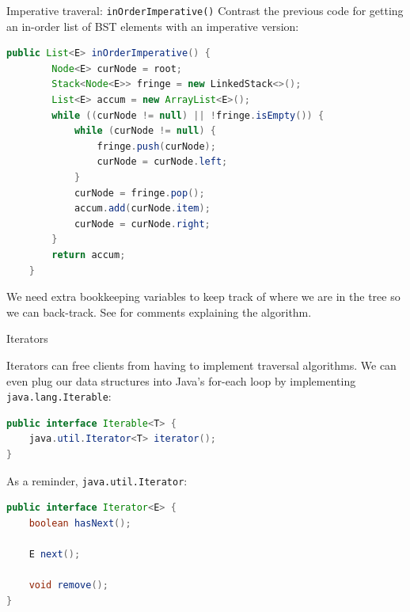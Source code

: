 \documentclass{beamer}
\begin{document}
\begin{frame}[fragile]{Imperative traveral: {\tt inOrderImperative()}}
\vspace{-.05in}
Contrast the previous code for getting an in-order list of BST elements with an imperative version:
\vspace{-.05in}
\begin{lstlisting}[language=Java]
    public List<E> inOrderImperative() {
        Node<E> curNode = root;
        Stack<Node<E>> fringe = new LinkedStack<>();
        List<E> accum = new ArrayList<E>();
        while ((curNode != null) || !fringe.isEmpty()) {
            while (curNode != null) {
                fringe.push(curNode);
                curNode = curNode.left;
            }
            curNode = fringe.pop();
            accum.add(curNode.item);
            curNode = curNode.right;
        }
        return accum;
    }
\end{lstlisting}
\vspace{-.05in}
We need extra bookkeeping variables to keep track of where we are in the tree so we can back-track.  See  for comments explaining the algorithm.

\end{frame}


\begin{frame}[fragile]{Iterators}


Iterators can free clients from having to implement traversal algorithms.  We can even plug our data structures into Java's for-each loop by implementing {\tt java.lang.Iterable}:
\begin{lstlisting}[language=Java]
public interface Iterable<T> {
    java.util.Iterator<T> iterator();
}
\end{lstlisting}
As a reminder, {\tt java.util.Iterator}:
\begin{lstlisting}[language=Java]
public interface Iterator<E> {
    boolean hasNext();

    E next();

    void remove();
}
\end{lstlisting}

\end{frame}
\end{document}
